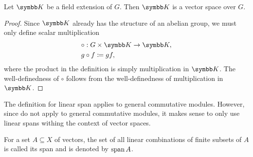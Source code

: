 \begin{proposition}\label{thm:field_extension_is_vector_space}
  Let \( \BK \) be a field extension of \( G \). Then \( \BK \) is a vector space over \( G \).
\end{proposition}
\begin{proof}
  Since \( \BK \) already has the structure of an abelian group, we must only define scalar multiplication
  \begin{align*}
    &\circ: G \times \BK \to \BK, \\
    &g \circ f \coloneqq gf,
  \end{align*}
  where the product in the definition is simply multiplication in \( \BK \). The well-definedness of \( \circ \) follows from the well-definedness of multiplication in \( \BK \).
\end{proof}

\begin{remark}\label{remark:linear_span_only_for_vector_spaces}
  The definition for linear span applies to general commutative modules. However, since  do not apply to general commutative modules, it makes sense to only use linear spans withing the context of vector spaces.
\end{remark}

\begin{definition}\label{def:linear_span}
  For a set \( A \subseteq X \) of vectors, the set of all linear combinations of finite subsets of \( A \) is called its span and is denoted by \( \operatorname{span}{A} \).
\end{definition}

